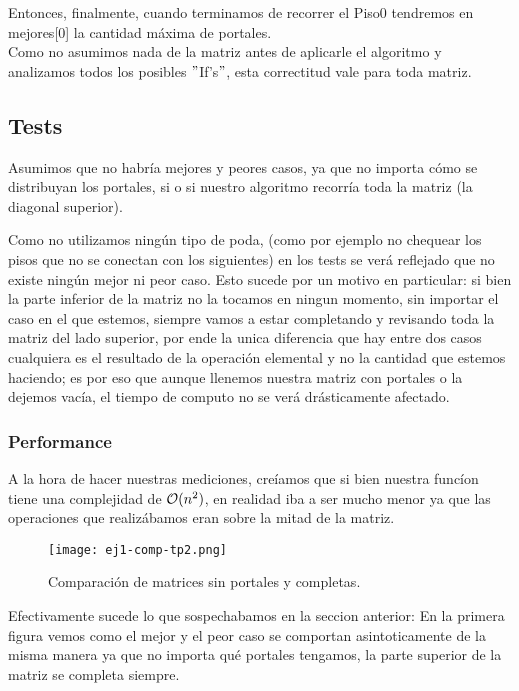 Entonces, finalmente, cuando terminamos de recorrer el Piso0 tendremos en mejores[0] la cantidad m\'axima de portales.\\

Como no asumimos nada de la matriz antes de aplicarle el algoritmo y analizamos todos los posibles $"$If's$"$, esta correctitud vale para toda matriz.



\subsection{Tests}

Asumimos que no habr\'ia mejores y peores casos, ya que no importa c\'omo se distribuyan los portales, si o si nuestro algoritmo recorr\'ia toda la matriz (la diagonal superior). 

Como no utilizamos ning\'un tipo de poda, (como por ejemplo no chequear los pisos que no se conectan con los siguientes) en los tests se ver\'a reflejado que no existe ning\'un mejor ni peor caso. Esto sucede por un motivo en particular: si bien la parte inferior de la matriz no la tocamos en ningun momento, sin importar el caso en el que estemos, siempre vamos a estar completando y revisando toda la matriz del lado superior, por ende la unica diferencia que hay entre dos casos cualquiera es el resultado de la operaci\'on elemental y no la cantidad que estemos haciendo; es por eso que aunque llenemos nuestra matriz con portales o la dejemos vac\'ia, el tiempo de computo no se ver\'a dr\'asticamente afectado.

\subsubsection{Performance}
A la hora de hacer nuestras mediciones, cre\'iamos que si bien nuestra func\'ion tiene una complejidad de $\mathcal{O}(n^2)$, en realidad iba a ser mucho menor ya que las operaciones que realiz\'abamos eran sobre la mitad de la matriz.\\




\begin{figure}[h!]
\texttt{[image: ej1-comp-tp2.png]}
\centering
\caption{Comparaci\'on de matrices sin portales y completas.}
\label{overflow3}
\end{figure}

Efectivamente sucede lo que sospechabamos en la seccion anterior: En la primera figura vemos como el mejor y el peor caso se comportan asintoticamente de la misma manera ya que no importa qu\'e portales tengamos, la parte superior de la matriz se completa siempre.\\ 

